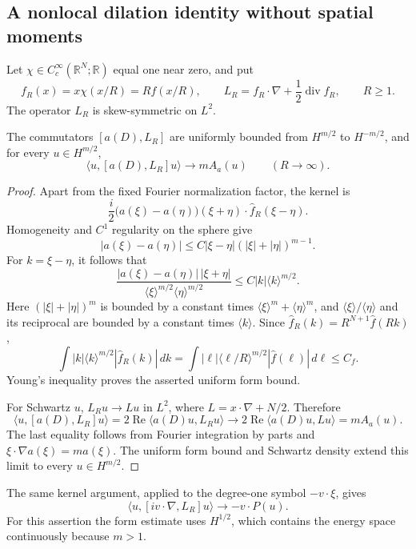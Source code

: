 \subsection{A nonlocal dilation identity without spatial moments}

Let $\chi\in C_c^\infty(\mathbb R^N;\mathbb R)$ equal one near zero, and
put
\[
 f_R(x)=x\chi(x/R)=R f(x/R),\qquad
 L_R=f_R\cdot\nabla+\frac12\operatorname{div}f_R,\qquad R\ge1.
\]
The operator $L_R$ is skew-symmetric on $L^2$.

\begin{lemma}\label{lem:r8-commutator}
The commutators $[a(D),L_R]$ are uniformly bounded from
$H^{m/2}$ to $H^{-m/2}$, and for every $u\in H^{m/2}$,
\begin{equation}\label{eq:r8-commutator-limit}
 \langle u,[a(D),L_R]u\rangle\longrightarrow mA_a(u)
 \qquad(R\to\infty).
\end{equation}
\end{lemma}
\begin{proof}
Apart from the fixed Fourier normalization factor, the kernel is
\[
 \frac i2\bigl(a(\xi)-a(\eta)\bigr)
 (\xi+\eta)\cdot\widehat f_R(\xi-\eta).
\]
Homogeneity and $C^1$ regularity on the sphere give
\[
 |a(\xi)-a(\eta)|
 \le C|\xi-\eta|(|\xi|+|\eta|)^{m-1}.
\]
For $k=\xi-\eta$, it follows that
\[
 \frac{|a(\xi)-a(\eta)|\,|\xi+\eta|}
 {\langle\xi\rangle^{m/2}\langle\eta\rangle^{m/2}}
 \le C|k|\langle k\rangle^{m/2}.
\]
Here $(|\xi|+|\eta|)^m$ is bounded by a constant times
$\langle\xi\rangle^m+\langle\eta\rangle^m$, and
$\langle\xi\rangle/\langle\eta\rangle$ and its reciprocal are bounded
by a constant times $\langle k\rangle$.
Since $\widehat f_R(k)=R^{N+1}\widehat f(Rk)$,
\[
 \int |k|\langle k\rangle^{m/2}|\widehat f_R(k)|\,dk
 =
 \int |\ell|\langle\ell/R\rangle^{m/2}|\widehat f(\ell)|\,d\ell
 \le C_f.
\]
Young's inequality proves the asserted uniform form bound.

For Schwartz $u$, $L_Ru\to Lu$ in $L^2$, where
$L=x\cdot\nabla+N/2$. Therefore
\[
 \langle u,[a(D),L_R]u\rangle
 =2\operatorname{Re}\langle a(D)u,L_Ru\rangle
 \longrightarrow
 2\operatorname{Re}\langle a(D)u,Lu\rangle=mA_a(u).
\]
The last equality follows from Fourier integration by parts and
$\xi\cdot\nabla a(\xi)=ma(\xi)$. The uniform form bound and
Schwartz density extend this limit to every $u\in H^{m/2}$.
\end{proof}

The same kernel argument, applied to the degree-one symbol
$-v\cdot\xi$, gives
\begin{equation}\label{eq:r8-drift-limit}
 \langle u,[iv\cdot\nabla,L_R]u\rangle
 \longrightarrow-v\cdot P(u).
\end{equation}
For this assertion the form estimate uses $H^{1/2}$, which contains
the energy space continuously because $m>1$.

